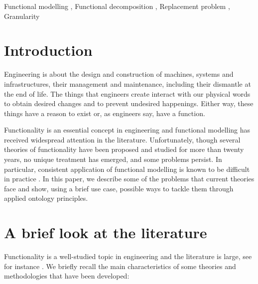 \documentclass[
]{ceurart}
\begin{document}
\begin{keywords}
  Functional modelling \sep
  Functional decomposition \sep
  Replacement problem \sep
  Granularity
\end{keywords}

\maketitle


\section{Introduction}
    
Engineering is about the design and construction of machines, systems and infrastructures, their management and maintenance, including their dismantle at the end of life.  The things that engineers create interact with our physical words to obtain desired changes and to prevent undesired happenings. Either way, these things have a reason to exist or, as engineers say, have a function. 

Functionality is an essential concept in engineering and functional modelling has received widespread attention in the literature. 
Unfortunately, though several theories of functionality have been proposed and studied for more than twenty years, no unique treatment has emerged, and some problems persist. In particular, consistent application of functional modelling is known to be difficult in practice \cite{eckertThatWhichNot2013}.
In this paper, we describe some of the problems that current theories face and show, using a brief use case, possible ways to tackle them through applied ontology principles. 

\section{A brief look at the literature}\label{sec:literature}

Functionality is a well-studied topic in engineering and the literature is large, %
see for instance \cite{pahl_engineering_2007,erdenReviewFunctionModeling2008}. %
We briefly recall the main characteristics of some theories and methodologies that have been developed: %
\end{document}
